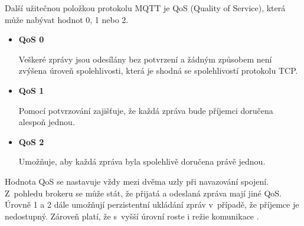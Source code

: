   Další užitečnou položkou protokolu MQTT je QoS (Quality of Service),
  která může nabývat hodnot 0, 1 nebo 2.
  
   \begin{itemize}
    \item \textbf{QoS 0}
    
    Veškeré zprávy jsou odesílány bez potvrzení a žádným způsobem
    není zvýšena úroveň spolehlivosti, která je shodná se spolehlivostí protokolu TCP.
    
    \newpage
    \item \textbf{QoS 1}
    
    Pomocí potvrzování zajišťuje, že každá zpráva bude příjemci doručena alespoň jednou.
    
    \item \textbf{QoS 2}
    
     Umožňuje, aby každá zpráva byla spolehlivě doručena právě jednou.
   \end{itemize}
  Hodnota QoS se nastavuje vždy mezi dvěma uzly při navazování spojení.
  Z~pohledu brokeru se může stát, že přijatá a odeslaná zpráva mají jiné QoS.
  Úrovně 1 a 2 dále umožňují perzistentní ukládání zpráv v~případě, že příjemce je
  nedostupný. Zároveň platí, že s~vyšší úrovní roste i režie komunikace \cite{mqtt_intro}.
